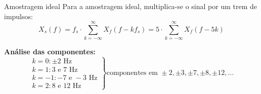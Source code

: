 \begin{frame}[fragile]{Amostragem ideal}
    Para a amostragem ideal, multiplica-se o sinal por um trem de impulsos:
    $$X_s(f) = f_s \cdot \sum_{k=-\infty}^{\infty} X_f(f - k f_s) = 5 \cdot \sum_{k=-\infty}^{\infty} X_f(f - 5k)$$
    
    \textbf{Análise das componentes:}
    $$
    \left.\begin{matrix}
    k=0: \pm 2\text{ Hz} \\
    k=1: 3 \text{ e } 7\text{ Hz} \\
    k=-1: -7 \text{ e } -3\text{ Hz} \\
    k=2: 8 \text{ e } 12\text{ Hz}
    \end{matrix}\right\} \text{componentes em } \pm 2, \pm 3, \pm 7, \pm 8, \pm 12, \dots
    $$
\end{frame}
    

